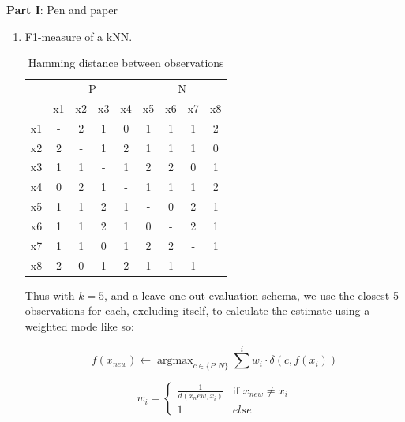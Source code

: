 \documentclass{article}
\DeclareMathOperator*{\argmax}{argmax}
\begin{document}
\setcounter{page}{0}
\thispagestyle{empty}
\renewcommand{\thesection}{\Roman{section}}

\newpage




\large{\textbf{Part I}: Pen and paper}\normalsize




\begin{enumerate}[leftmargin=\labelsep]
\item F1-measure of a kNN.


\begin{table}[H]
  \centering
  \begin{tabular}{c|cccc|cccc|}
    \multicolumn{1}{c}{} & \multicolumn{4}{c}{P} & \multicolumn{4}{c}{N}  \\
      & x1 & x2 & x3 & x4 & x5 & x6 & x7 & x8  \\ \hline
  x1  & -  & 2  & 1  & 0  & 1  & 1  & 1  & 2   \\
  x2  & 2  & -  & 1  & 2  & 1  & 1  & 1  & 0   \\
  x3  & 1  & 1  & -  & 1  & 2  & 2  & 0  & 1   \\
  x4  & 0  & 2  & 1  & -  & 1  & 1  & 1  & 2   \\
  x5  & 1  & 1  & 2  & 1  & -  & 0  & 2  & 1   \\
  x6  & 1  & 1  & 2  & 1  & 0  & -  & 2  & 1   \\
  x7  & 1  & 1  & 0  & 1  & 2  & 2  & -  & 1   \\
  x8  & 2  & 0  & 1  & 2  & 1  & 1  & 1  & -   \\ \hline
  \end{tabular}
  \caption{Hamming distance between observations}
\end{table}


Thus with $k = 5$, and a leave-one-out evaluation schema,
we use the closest 5 observations for each, excluding itself,
to calculate the estimate using a weighted mode like so:

\begin{equation*}
  f(x_{new}) \leftarrow \argmax_{c \in \{P, N\} } \sum^i w_i \cdot \delta(c, f(x_i))
\end{equation*}

\begin{equation*}
  w_i = \begin{cases}
    \frac{1}{d(x_new, x_i)} & \text{if\ } x_{new} \neq x_i \\
    1 & else
  \end{cases}
\end{equation*}


\end{enumerate}
\end{document}
